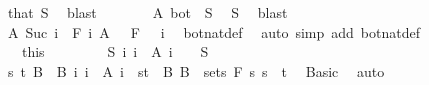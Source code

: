 \begin{isabellebody}
\ that\ S\ \isamarkupfalse%
\ blast\isanewline
\ \ \ \ \isamarkupfalse%
\ \isamarkupfalse%
\ {\isachardoublequoteopen}A\ bot\ {\isacharequal}{\kern0pt}\ S{\isachardoublequoteclose}\ \isamarkupfalse%
\ S\ \isamarkupfalse%
\ blast\isanewline
\ \ \ \ \isamarkupfalse%
\ \isamarkupfalse%
\ {\isachardoublequoteopen}A\ {\isacharparenleft}{\kern0pt}Suc\ i{\isacharparenright}{\kern0pt}\ {\isasymin}\ F\ i{\isachardoublequoteclose}\ {\isachardoublequoteopen}A\ {}\ {\isasymin}\ F\ {}{\isachardoublequoteclose}\ \ i\ \isamarkupfalse%
\ bot{\isacharunderscore}{\kern0pt}nat{\isacharunderscore}{\kern0pt}def\ \isamarkupfalse%
\ {\isacharparenleft}{\kern0pt}auto\ simp\ add{\isacharcolon}{\kern0pt}\ bot{\isacharunderscore}{\kern0pt}nat{\isacharunderscore}{\kern0pt}def{\isacharparenright}{\kern0pt}\isanewline
\ \ \isacommand{{\isacharbraceright}{\kern0pt}}\isamarkupfalse%
\isanewline
\ \ \isamarkupfalse%
\ {\isacharasterisk}{\kern0pt}\ {\isacharequal}{\kern0pt}\ this\isanewline
\ \ \isacommand{{\isacharbraceleft}{\kern0pt}}\isamarkupfalse%
\isanewline
\ \ \ \ \isamarkupfalse%
\ {\isachardoublequoteopen}{\isasymnexists}S{\isachardot}{\kern0pt}\ {\isacharparenleft}{\kern0pt}{\isasymUnion}i{\isachardot}{\kern0pt}\ {\isacharbraceleft}{\kern0pt}i{\isacharbraceright}{\kern0pt}\ {\isasymtimes}\ A\ i{\isacharparenright}{\kern0pt}\ {\isacharequal}{\kern0pt}\ {\isacharbraceleft}{\kern0pt}{}{\isacharbraceright}{\kern0pt}\ {\isasymtimes}\ S{\isachardoublequoteclose}\isanewline
\ \ \ \ \isamarkupfalse%
\ \isamarkupfalse%
\ s\ t\ B\ \ B{\isacharcolon}{\kern0pt}\ {\isachardoublequoteopen}{\isacharparenleft}{\kern0pt}{\isasymUnion}i{\isachardot}{\kern0pt}\ {\isacharbraceleft}{\kern0pt}i{\isacharbraceright}{\kern0pt}\ {\isasymtimes}\ A\ i{\isacharparenright}{\kern0pt}\ {\isacharequal}{\kern0pt}\ {\isacharbraceleft}{\kern0pt}s{\isacharless}{\kern0pt}{\isachardot}{\kern0pt}{\isachardot}{\kern0pt}t{\isacharbraceright}{\kern0pt}\ {\isasymtimes}\ B{\isachardoublequoteclose}\ {\isachardoublequoteopen}B\ {\isasymin}\ sets\ {\isacharparenleft}{\kern0pt}F\ s{\isacharparenright}{\kern0pt}{\isachardoublequoteclose}\ {\isachardoublequoteopen}s\ {\isacharless}{\kern0pt}\ t{\isachardoublequoteclose}\ \isamarkupfalse%
\ Basic\ \isamarkupfalse%
\ auto\isanewline
\ \ \ \ \isamarkupfalse%

\end{isabellebody}
